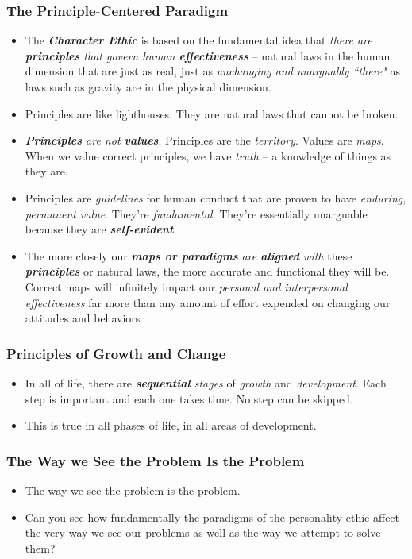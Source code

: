 \documentclass[11pt]{article}
\begin{document}
\subsubsection{The Principle-Centered Paradigm}
\begin{itemize}
\item The \emph{\textbf{Character Ethic}} is based on the fundamental idea that \emph{there are \textbf{principles} that govern human \textbf{effectiveness}} -- natural laws in the human dimension that are just as real, just as \emph{unchanging and unarguably ``there"} as laws such as gravity are in the physical dimension.

\item Principles are like lighthouses. They are natural laws that cannot be broken. 

\item \emph{\textbf{Principles} are not \textbf{values}}. Principles are the \emph{territory}. Values are \emph{maps}. When we value correct principles, we have \emph{truth} -- a knowledge of things as they are.

\item Principles are \emph{guidelines} for human conduct that are proven to have \emph{enduring}, \emph{permanent value}. They're \emph{fundamental}. They're essentially unarguable because they are \emph{\textbf{self-evident}}. 

\item The more closely our \emph{\textbf{maps or paradigms}} \emph{are \textbf{aligned} with} these \emph{\textbf{principles}} or natural laws, the more accurate and functional they will be. Correct maps will infinitely impact our \emph{personal and interpersonal effectiveness} far more than any amount of effort expended on changing our attitudes and
behaviors
\end{itemize}
\subsubsection{Principles of Growth and Change}
\begin{itemize}
\item In all of life, there are \emph{\textbf{sequential} stages} of \emph{growth} and \emph{development}. Each step is important and each one takes time. No step
can be skipped.

\item This is true in all phases of life, in all areas of development.
\end{itemize}
\subsubsection{The Way we See the Problem Is the Problem}
\begin{itemize}
\item The way we see the problem is the problem.

\item Can you see how fundamentally the paradigms of the personality ethic affect the very way we see our problems as well as the way we attempt to solve them?
\end{itemize}
\end{document}

